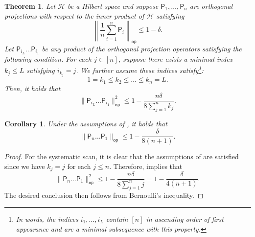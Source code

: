 \documentclass[10pt,a4paper]{article}
\newtheorem{theorem}{Theorem}[section]
\newtheorem{corollary}{Corollary}[section]
\begin{document}
\begin{theorem}
\label{thm:gen_gap}
        Let $\mathcal{H}$ be a Hilbert space and suppose $\mathsf{P}_1,\ldots, \mathsf{P}_n$ are orthogonal projections with respect to the inner product of $\mathcal{H}$ satisfying
        \begin{equation}
    \left\|\frac{1}{n}\sum_{i=1}^n \mathsf{P}_i\right\|_{\mathsf{op}}\leq 1-\delta.
\end{equation} 
Let $\mathsf{P}_{i_L}\ldots \mathsf{P}_{i_1}$ be any product of the orthogonal projection operators satisfying the following condition. For each $j\in [n]$, suppose there exists a minimal index $k_j\leq L$ satisfying $i_{k_j}=j$. We further assume these indices satisfy\footnote{In words, the indices $i_1,\ldots,i_L$ contain $[n]$ in ascending order of first appearance and are a minimal subsequence with this property.}:
\begin{equation}
\label{eq:order}
        1=k_1\leq k_2\leq\ldots\leq k_n=L.
\end{equation}
Then, it holds that
\begin{equation*}
    \|\mathsf{P}_{i_L}\ldots \mathsf{P}_{i_1}\|_{\mathsf{op}}^2\leq 1-\frac{n\delta}{8\sum_{j=1}^n k_j}.
\end{equation*}
\end{theorem}

\begin{corollary}
\label{cor:spectral_scan}
    Under the assumptions of , it holds that 
    \begin{equation*}
        \|\mathsf{P}_n\ldots \mathsf{P}_1\|_{\mathsf{op}}\leq 1-\frac{\delta}{8(n+1)}.
    \end{equation*}
\end{corollary}

\begin{proof}
    For the systematic scan, it is clear that the assumptions of  are satisfied since we have $k_j=j$ for each $j\leq n$. Therefore,  implies that
    \begin{equation*}
        \|\mathsf{P}_n\ldots \mathsf{P}_1\|_{\mathsf{op}}^2\leq 1-\frac{n\delta}{8\sum_{j=1}^n j}=1-\frac{\delta}{4(n+1)}.
    \end{equation*}
    The desired conclusion then follows from Bernoulli's inequality.
\end{proof}
\end{document}

